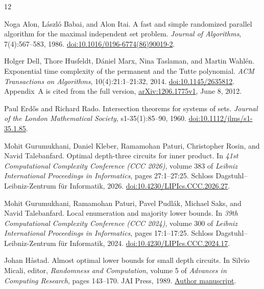\begin{thebibliography}{12}

Noga Alon, L\'aszl\'o Babai, and Alon Itai.
\newblock A fast and simple randomized parallel algorithm for the maximal
independent set problem.
\newblock \emph{Journal of Algorithms}, 7(4):567--583, 1986.
\newblock \href{https://doi.org/10.1016/0196-6774(86)90019-2}
{doi:10.1016/0196-6774(86)90019-2}.

Holger Dell, Thore Husfeldt, D\'aniel Marx, Nina Taslaman, and Martin Wahl\'en.
\newblock Exponential time complexity of the permanent and the Tutte polynomial.
\newblock \emph{ACM Transactions on Algorithms}, 10(4):21:1--21:32, 2014.
\newblock \href{https://doi.org/10.1145/2635812}{doi:10.1145/2635812}.
\newblock Appendix~A is cited from the full version,
\href{https://arxiv.org/abs/1206.1775v1}{arXiv:1206.1775v1}, June 8, 2012.

Paul Erd\H{o}s and Richard Rado.
\newblock Intersection theorems for systems of sets.
\newblock \emph{Journal of the London Mathematical Society},
s1-35(1):85--90, 1960.
\newblock \href{https://doi.org/10.1112/jlms/s1-35.1.85}
{doi:10.1112/jlms/s1-35.1.85}.

Mohit Gurumukhani, Daniel Kleber, Ramamohan Paturi, Christopher Rosin,
and Navid Talebanfard.
\newblock Optimal depth-three circuits for inner product.
\newblock In \emph{41st Computational Complexity Conference (CCC 2026)},
volume 383 of \emph{Leibniz International Proceedings in Informatics},
pages 27:1--27:25. Schloss Dagstuhl--Leibniz-Zentrum f\"ur Informatik, 2026.
\newblock \href{https://doi.org/10.4230/LIPIcs.CCC.2026.27}
{doi:10.4230/LIPIcs.CCC.2026.27}.

Mohit Gurumukhani, Ramamohan Paturi, Pavel Pudl\'ak, Michael Saks,
and Navid Talebanfard.
\newblock Local enumeration and majority lower bounds.
\newblock In \emph{39th Computational Complexity Conference (CCC 2024)},
volume 300 of \emph{Leibniz International Proceedings in Informatics},
pages 17:1--17:25. Schloss Dagstuhl--Leibniz-Zentrum f\"ur Informatik, 2024.
\newblock \href{https://doi.org/10.4230/LIPIcs.CCC.2024.17}
{doi:10.4230/LIPIcs.CCC.2024.17}.

Johan H\aa stad.
\newblock Almost optimal lower bounds for small depth circuits.
\newblock In Silvio Micali, editor, \emph{Randomness and Computation},
volume 5 of \emph{Advances in Computing Research}, pages 143--170.
JAI Press, 1989.
\newblock \href{https://www.csc.kth.se/~johanh/largesmalldepth.pdf}
{Author manuscript}.


\end{thebibliography}
